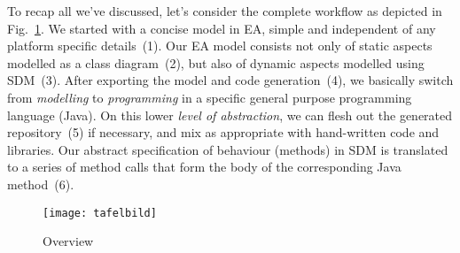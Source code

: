 To recap all we've discussed, let's consider the complete workflow as depicted in Fig.~\ref{fig_Overview}.
We started with a concise model in EA, simple and independent of any platform specific details~(1).  Our EA model consists not only of static aspects modelled
as a class diagram~(2), but also of dynamic aspects modelled using SDM~(3).  After exporting the model and code generation~(4), we basically switch from
\emph{modelling} to \emph{programming} in a specific general purpose programming language (Java).
On this lower \emph{level of abstraction}, we can flesh out the generated repository~(5) if necessary, and mix as appropriate with hand-written code and
libraries.  Our abstract specification of behaviour (methods) in SDM is translated to a series of method calls that form the body of the corresponding Java
method~(6).

\newpage
{}

\vspace*{3cm}
\begin{figure}[htbp]
	\centering
  \texttt{[image: tafelbild]}
	\caption{Overview}
	\label{fig_Overview}
\end{figure}

\clearpage